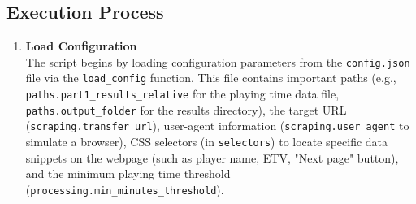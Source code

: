 \documentclass[12pt, a4paper]{report}
\begin{document}
\subsection{Execution Process}
\begin{enumerate}[label=\textbf{Step \arabic*:}, leftmargin=* , itemsep=1ex]
    \item \textbf{Load Configuration} \\
    The script begins by loading configuration parameters from the \texttt{config.json} file via the \texttt{load\_config} function.
    This file contains important paths (e.g., \texttt{paths.part1\_results\_relative} for the playing time data file, \texttt{paths.output\_folder} for the results directory), the target URL (\texttt{scraping.transfer\_url}), user-agent information (\texttt{scraping.user\_agent} to simulate a browser), CSS selectors (in \texttt{selectors}) to locate specific data snippets on the webpage (such as player name, ETV, "Next page" button), and the minimum playing time threshold (\texttt{processing.min\_minutes\_threshold}).


\end{enumerate}
\end{document}
